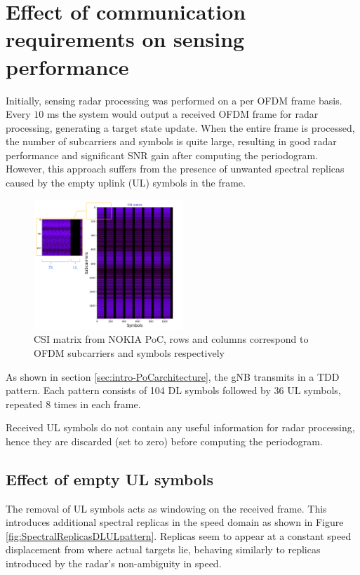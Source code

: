 \chapter{Effect of communication requirements on sensing performance}
\label{chap:TDD pattern of the OFDM frame}


Initially, sensing radar processing was performed on a per OFDM frame basis. \protect\newline Every $10$ ms the system would output a received OFDM frame for radar processing, generating a target state update. When the entire frame is processed, the number of subcarriers and symbols is quite large, resulting in good radar performance and significant SNR gain after computing the periodogram. However, this approach suffers from the presence of unwanted spectral replicas caused by the empty uplink (UL) symbols in the frame.

\begin{figure}[H]
    \centering
    \includegraphics[width=0.5\textwidth]{Images/TDDprocessing/CSIMatrix_DLULpattern.png}
    \caption{CSI matrix from NOKIA PoC, rows and columns correspond to OFDM subcarriers and symbols respectively}
    \label{fig:CSIMatrix_DLULpattern}
\end{figure}

As shown in section \ref{sec:intro-PoCarchitecture}, the gNB transmits in a TDD pattern. Each pattern consists of 104 DL symbols followed by 36 UL symbols, repeated 8 times in each frame.

Received UL symbols do not contain any useful information for radar processing, hence they are discarded (set to zero) before computing the periodogram.

\section{Effect of empty UL symbols}
    
    The removal of UL symbols acts as windowing on the received frame. This introduces additional spectral replicas in the speed domain as shown in Figure \ref{fig:SpectralReplicasDLULpattern}. Replicas seem to appear at a constant speed displacement from where actual targets lie, behaving similarly to replicas introduced by the radar's non-ambiguity in speed.
    
